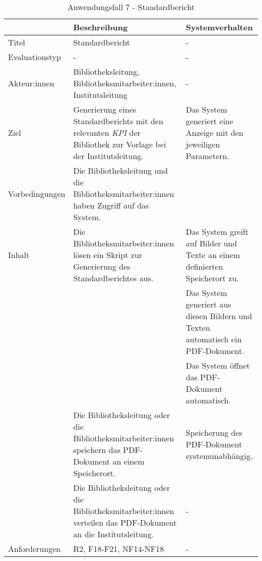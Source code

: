 \begingroup
\setlength{\tabcolsep}{9pt} %
\renewcommand{\arraystretch}{1.25} 
\begin{table}[h]
    \centering
    \begin{adjustbox}{max width=\textwidth}
    \begin{tabular}{lp{7.0cm}p{7.0cm}}
       \toprule
       \textbf{}          & \textbf{Beschreibung} &\textbf{Systemverhalten}\\
       \midrule
        Titel                            &Standardbericht& -\\
        Evaluationstyp                   &-                   & -\\
        Akteur:innen                     &Bibliotheksleitung, Bibliotheksmitarbeiter:innen, Institutsleitung& -\\
        Ziel                             &Generierung eines Standardberichts mit den relevanten \textit{\acrshort{KPI}} der Bibliothek zur Vorlage bei der Institutsleitung. & Das System generiert eine Anzeige mit den jeweiligen Parametern.\\
        Vorbedingungen                   &Die Bibliotheksleitung und die Bibliotheksmitarbeiter:innen haben Zugriff auf das System.& \\
        Inhalt                           &Die Bibliotheksmitarbeiter:innen lösen ein Skript zur Generierung des Standardberichtes aus.& Das System greift auf Bilder und Texte an einem definierten Speicherort zu.\\
                                         & &Das System generiert aus diesen Bildern und Texten automatisch ein PDF-Dokument.\\
                                         & &Das System öffnet das PDF-Dokument automatisch.\\
                                         &Die Bibliotheksleitung oder die Bibliotheksmitarbeiter:innen speichern das PDF-Dokument an einem Speicherort. &Speicherung des PDF-Dokument systemunabhängig.\\
                                         &Die Bibliotheksleitung oder die Bibliotheksmitarbeiter:innen verteilen das PDF-Dokument an die Institutsleitung. &-\\

       

        Anforderungen                   &R2, F18-F21, NF14-NF18& -\\
        \bottomrule
    \end{tabular}
    \end{adjustbox}
    \caption{%
    Anwendungsfall 7 - Standardbericht   }
    \label{tab:AF_Standardbericht}
    \end{table}
\endgroup

